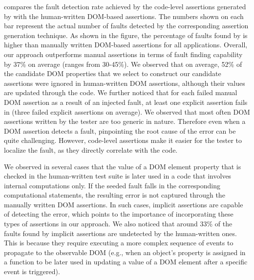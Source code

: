  compares the fault detection rate achieved by the code-level assertions generated by \tool with the human-written DOM-based assertions. The numbers shown on each bar represent the actual number of faults detected by the corresponding assertion generation technique. As shown in the figure, the percentage of faults found by \tool is higher than manually written DOM-based assertions for all applications. Overall, our approach outperforms manual assertions in terms of fault finding capability by 37\% on average (ranges from 30-45\%). We observed that on average, 52\% of the candidate DOM properties that we select to construct our candidate assertions were ignored in human-written DOM assertions, although their values are updated through the \javascript code.
We further noticed that for each failed manual DOM assertion as a result of an injected fault, at least one explicit assertion fails in \tool (three failed explicit assertions on average).
We observed that most often DOM assertions written by the tester are too generic in nature. Therefore even when a DOM assertion detects a \javascript fault, pinpointing the root cause of the error can be quite challenging. However, code-level assertions make it easier for the tester to localize the fault, as they directly correlate with the code.

We observed in several cases that the value of a DOM element property that is checked in the human-written test suite is later used in a \javascript code that involves internal computations only. If the seeded fault falls in the corresponding computational statements, the resulting error is not captured through the manually written DOM assertions. In such cases, implicit assertions are capable of detecting the error, which points to the importance of incorporating these types of assertions in our approach. We also noticed that around 33\% of the faults found by implicit assertions are undetected by the human-written ones. This is because they require executing a more complex sequence of events to propagate to the observable DOM (e.g., when an object's property is assigned in a function to be later used in updating a value of a DOM element after a specific event is triggered). 


